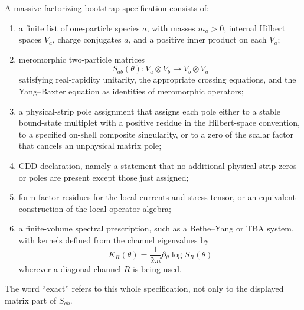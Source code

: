 \begin{definition}
\label{def:massive-factorizing-bootstrap-specification}
A massive factorizing bootstrap specification consists of:
\begin{enumerate}
  \item a finite list of one-particle species \(a\), with masses \(m_a>0\),
  internal Hilbert spaces \(V_a\), charge conjugates \(\bar a\), and a
  positive inner product on each \(V_a\);
  \item meromorphic two-particle matrices
  \[
    S_{ab}(\theta):V_a\otimes V_b\longrightarrow V_b\otimes V_a
  \]
  satisfying real-rapidity unitarity, the appropriate crossing equations,
  and the Yang--Baxter equation as identities of meromorphic operators;
  \item a physical-strip pole assignment that assigns each pole either to a stable
  bound-state multiplet with a positive residue in the Hilbert-space
  convention, to a specified on-shell composite singularity, or to a zero of
  the scalar factor that cancels an unphysical matrix pole;
  \item CDD declaration, namely a statement that no additional physical-strip
  zeros or poles are present except those just assigned;
  \item form-factor residues for the local currents and stress tensor, or an
  equivalent construction of the local operator algebra;
  \item a finite-volume spectral prescription, such as a Bethe--Yang or TBA
  system, with kernels defined from the channel eigenvalues by
  \[
    K_R(\theta)=\frac1{2\pi\ii}\partial_\theta\log S_R(\theta)
  \]
  wherever a diagonal channel \(R\) is being used.
\end{enumerate}
The word ``exact'' refers to this whole specification, not only to the displayed
matrix part of \(S_{ab}\).
\end{definition}

